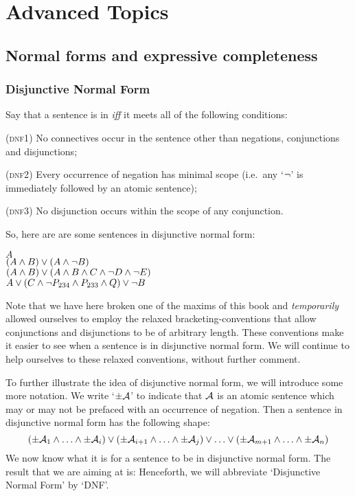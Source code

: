 \part{Advanced Topics}

\chapter{Normal forms and expressive completeness}
\label{ch:normalform}

\section{Disjunctive Normal Form}\label{s:DNFDefined}

Say that a sentence is in  \emph{iff} it meets all of the following conditions:
	\begin{earg}
		\item[(\textsc{dnf1})] No connectives occur in the sentence other than negations, conjunctions and disjunctions;
		\item[(\textsc{dnf2})] Every occurrence of negation has minimal scope (i.e.\ any `$\neg$' is immediately followed by an atomic sentence);
		\item[(\textsc{dnf3})] No disjunction occurs within the scope of any conjunction.
	\end{earg}
So, here are are some sentences in disjunctive normal form:
	\begin{center}
		$A$\\
		$(A \wedge B) \vee (A \wedge \neg B)$\\
		$(A \wedge B) \vee (A \wedge  B \wedge C \wedge \neg D \wedge \neg E)$\\
		$A \vee (C \wedge \neg P_{234} \wedge P_{233} \wedge Q) \vee \neg B$
	\end{center}
Note that we have here broken one of the maxims of this book and \emph{temporarily} allowed ourselves to employ the relaxed bracketing-conventions that allow conjunctions and disjunctions to be of arbitrary length. These conventions make it easier to see when a sentence is in disjunctive normal form. We will continue to help ourselves to these relaxed conventions, without further comment.

To further illustrate the idea of disjunctive normal form, we will introduce some more notation. We write `$\pm\mathcal{A}$' to indicate that $\mathcal{A}$ is an atomic sentence which may or may not be prefaced with an occurrence of negation. Then a sentence in disjunctive normal form has the following shape:
	$$(\pm \mathcal{A}_1 \land \ldots \land \pm \mathcal{A}_i) \lor (\pm \mathcal{A}_{i+1} \land \ldots \land \pm\mathcal{A}_j) \lor \ldots \lor (\pm\mathcal{A}_{m+1} \land \ldots \land \pm \mathcal{A}_n)$$
We now know what it is for a sentence to be in disjunctive normal form. The result that we are aiming at is:
Henceforth, we will abbreviate `Disjunctive Normal Form' by `DNF'. 


